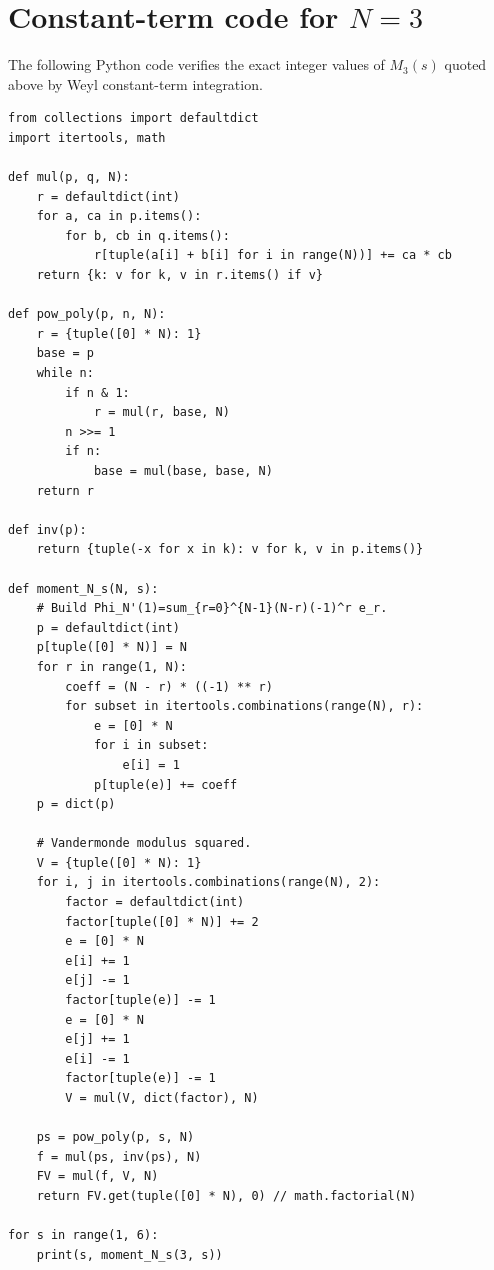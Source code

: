 \documentclass[11pt]{article}
\theoremstyle{plain}
\theoremstyle{definition}
\numberwithin{equation}{section}
\begin{document}
\appendix

\section{Constant-term code for \(N=3\)}
The following Python code verifies the exact integer values of \(M_3(s)\) quoted above by Weyl constant-term integration.

\begin{verbatim}
from collections import defaultdict
import itertools, math

def mul(p, q, N):
    r = defaultdict(int)
    for a, ca in p.items():
        for b, cb in q.items():
            r[tuple(a[i] + b[i] for i in range(N))] += ca * cb
    return {k: v for k, v in r.items() if v}

def pow_poly(p, n, N):
    r = {tuple([0] * N): 1}
    base = p
    while n:
        if n & 1:
            r = mul(r, base, N)
        n >>= 1
        if n:
            base = mul(base, base, N)
    return r

def inv(p):
    return {tuple(-x for x in k): v for k, v in p.items()}

def moment_N_s(N, s):
    # Build Phi_N'(1)=sum_{r=0}^{N-1}(N-r)(-1)^r e_r.
    p = defaultdict(int)
    p[tuple([0] * N)] = N
    for r in range(1, N):
        coeff = (N - r) * ((-1) ** r)
        for subset in itertools.combinations(range(N), r):
            e = [0] * N
            for i in subset:
                e[i] = 1
            p[tuple(e)] += coeff
    p = dict(p)

    # Vandermonde modulus squared.
    V = {tuple([0] * N): 1}
    for i, j in itertools.combinations(range(N), 2):
        factor = defaultdict(int)
        factor[tuple([0] * N)] += 2
        e = [0] * N
        e[i] += 1
        e[j] -= 1
        factor[tuple(e)] -= 1
        e = [0] * N
        e[j] += 1
        e[i] -= 1
        factor[tuple(e)] -= 1
        V = mul(V, dict(factor), N)

    ps = pow_poly(p, s, N)
    f = mul(ps, inv(ps), N)
    FV = mul(f, V, N)
    return FV.get(tuple([0] * N), 0) // math.factorial(N)

for s in range(1, 6):
    print(s, moment_N_s(3, s))
\end{verbatim}
\end{document}
